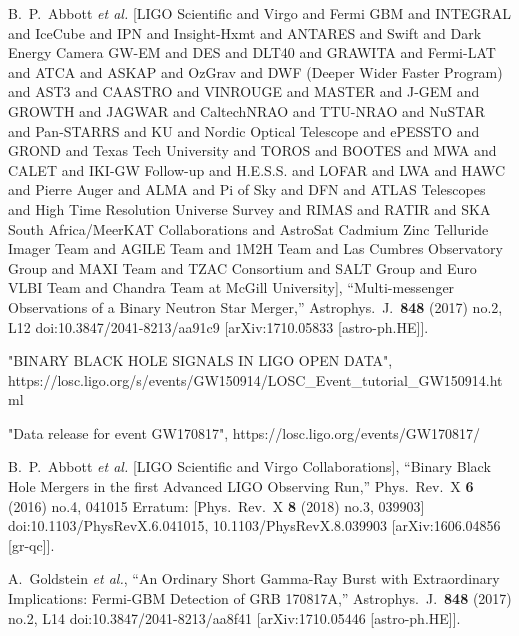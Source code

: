 \documentclass[a4paper,11pt]{article}
\begin{document}
\begin{thebibliography}{99}
  B.~P.~Abbott {\it et al.} [LIGO Scientific and Virgo and Fermi GBM and INTEGRAL and IceCube and IPN and Insight-Hxmt and ANTARES and Swift and Dark Energy Camera GW-EM and DES and DLT40 and GRAWITA and Fermi-LAT and ATCA and ASKAP and OzGrav and DWF (Deeper Wider Faster Program) and AST3 and CAASTRO and VINROUGE and MASTER and J-GEM and GROWTH and JAGWAR and CaltechNRAO and TTU-NRAO and NuSTAR and Pan-STARRS and KU and Nordic Optical Telescope and ePESSTO and GROND and Texas Tech University and TOROS and BOOTES and MWA and CALET and IKI-GW Follow-up and H.E.S.S. and LOFAR and LWA and HAWC and Pierre Auger and ALMA and Pi of Sky and DFN and ATLAS Telescopes and High Time Resolution Universe Survey and RIMAS and RATIR and SKA South Africa/MeerKAT Collaborations and AstroSat Cadmium Zinc Telluride Imager Team and AGILE Team and 1M2H Team and Las Cumbres Observatory Group and MAXI Team and TZAC Consortium and SALT Group and Euro VLBI Team and Chandra Team at McGill University],
  ``Multi-messenger Observations of a Binary Neutron Star Merger,''
  Astrophys.\ J.\  {\bf 848} (2017) no.2,  L12
  doi:10.3847/2041-8213/aa91c9
  [arXiv:1710.05833 [astro-ph.HE]].

  "BINARY BLACK HOLE SIGNALS IN LIGO OPEN DATA",
  {https://losc.ligo.org/s/events/GW150914/LOSC\_Event\_tutorial\_GW150914.html}
  
  "Data release for event GW170817",
  {https://losc.ligo.org/events/GW170817/}
  
  B.~P.~Abbott {\it et al.} [LIGO Scientific and Virgo Collaborations],
  ``Binary Black Hole Mergers in the first Advanced LIGO Observing Run,''
  Phys.\ Rev.\ X {\bf 6} (2016) no.4,  041015
   Erratum: [Phys.\ Rev.\ X {\bf 8} (2018) no.3,  039903]
  doi:10.1103/PhysRevX.6.041015, 10.1103/PhysRevX.8.039903
  [arXiv:1606.04856 [gr-qc]].

  A.~Goldstein {\it et al.},
  ``An Ordinary Short Gamma-Ray Burst with Extraordinary Implications: Fermi-GBM Detection of GRB 170817A,''
  Astrophys.\ J.\  {\bf 848} (2017) no.2,  L14
  doi:10.3847/2041-8213/aa8f41
  [arXiv:1710.05446 [astro-ph.HE]].


\end{thebibliography}
\end{document}
